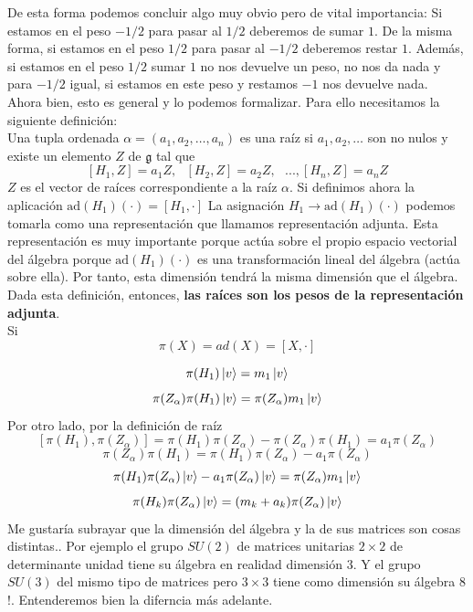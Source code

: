 \documentclass[12pt]{article}
\begin{document}
\begin{center}
\end{center}
De esta forma podemos concluir algo muy obvio pero de vital importancia: Si estamos en el peso $-1/2$ para pasar al $1/2$ deberemos de sumar $1$. De la misma forma, si estamos en el peso $1/2$ para pasar al $-1/2$ deberemos restar $1$. Además, si estamos en el peso $1/2$ sumar $1$ no nos devuelve un peso, no nos da nada y para $-1/2$ igual, si estamos en este peso y restamos $-1$ nos devuelve nada.\\ Ahora bien, esto es general y lo podemos formalizar. Para ello necesitamos la siguiente definición: \\ 
Una tupla ordenada $\alpha=(a_1, a_2, \dots,a_n)$ es una raíz si $a_1, a_2, \dots$ son no nulos y existe un elemento $Z$ de $\mathfrak{g}$ tal que
$$[H_1,Z]=a_1Z, \ \ \ [H_2,Z]=a_2Z , \ \ \ ...,[H_n,Z]=a_nZ$$
$Z$ es el vector de raíces correspondiente a la raíz $\alpha$. 
Si definimos ahora la aplicación $\text{ad}(H_1)(\cdot)=[H_1,\cdot]$ La asignación $H_1\rightarrow \text{ad}(H_1)(\cdot)$  podemos tomarla como una representación que llamamos representación adjunta. Esta representación es muy importante porque actúa sobre el propio espacio vectorial del álgebra porque $\text{ad}(H_1)(\cdot)$ es una transformación lineal del álgebra (actúa sobre ella). Por tanto, esta dimensión tendrá la misma dimensión que el álgebra. Dada esta definición, entonces, \textbf{las raíces son los pesos de la representación adjunta}.\\
Si $$\pi(X) =ad(X)=[X,\cdot]$$

$$\pi (H_1)\ket{v}=m_1 \ket {v}$$
$$\pi(Z_\alpha) \pi (H_1)\ket{v}=\pi(Z_\alpha) m_1 \ket{v}$$
Por otro lado, por la definición de raíz
$$[\pi(H_1),\pi(Z_\alpha)]=\pi(H_1)\pi(Z_\alpha)-\pi(Z_\alpha)\pi(H_1)=a_1\pi(Z_\alpha)$$
$$\pi(Z_\alpha)\pi(H_1)=\pi(H_1)\pi(Z_\alpha)-a_1\pi(Z_\alpha)$$
$$\pi(H_1)\pi(Z_\alpha)\ket{v}-a_1\pi(Z_\alpha)\ket{v}=\pi(Z_\alpha) m_1 \ket{v}$$
$$\pi(H_k)\pi(Z_\alpha)\ket{v}=(m_k+a_k) \pi(Z_\alpha)\ket{v}$$
Me gustaría subrayar que la dimensión del álgebra y la de sus matrices son cosas distintas.. Por ejemplo el grupo $SU(2)$ de matrices unitarias $2\times 2$ de determinante unidad tiene su álgebra en realidad dimensión $3$. Y el grupo $SU(3)$ del mismo tipo de matrices pero $3\times 3$ tiene como dimensión su álgebra $8$!. Entenderemos bien la diferncia más adelante. \\\\
\end{document}
